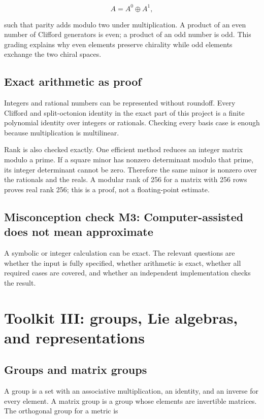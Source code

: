 \documentclass[11pt]{article}
\begin{document}
\[
A=A^0\mathbin{\oplus}A^1,
\]

such that parity adds modulo two under multiplication. A product of an even number of Clifford generators is even; a product of an odd number is odd. This grading explains why even elements preserve chirality while odd elements exchange the two chiral spaces.

\subsection{Exact arithmetic as proof}

Integers and rational numbers can be represented without roundoff. Every Clifford and split-octonion identity in the exact part of this project is a finite polynomial identity over integers or rationals. Checking every basis case is enough because multiplication is multilinear.

Rank is also checked exactly. One efficient method reduces an integer matrix modulo a prime. If a square minor has nonzero determinant modulo that prime, its integer determinant cannot be zero. Therefore the same minor is nonzero over the rationals and the reals. A modular rank of 256 for a matrix with 256 rows proves real rank 256; this is a proof, not a floating-point estimate.

\subsection{Misconception check M3: Computer-assisted does not mean approximate}

A symbolic or integer calculation can be exact. The relevant questions are whether the input is fully specified, whether arithmetic is exact, whether all required cases are covered, and whether an independent implementation checks the result.

\section{Toolkit III: groups, Lie algebras, and representations}

\subsection{Groups and matrix groups}

A group is a set with an associative multiplication, an identity, and an inverse for every element. A matrix group is a group whose elements are invertible matrices. The orthogonal group for a metric \texttt{} is
\end{document}

